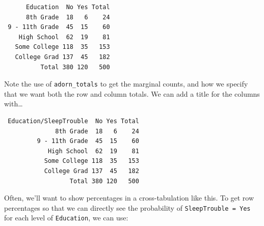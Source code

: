 \documentclass[
]{book}
\newenvironment{Shaded}{\begin{snugshade}}{\end{snugshade}}
\newcommand{\DataTypeTok}[1]{\textcolor[rgb]{0.13,0.29,0.53}{#1}}
\newcommand{\KeywordTok}[1]{\textcolor[rgb]{0.13,0.29,0.53}{\textbf{#1}}}
\newcommand{\NormalTok}[1]{#1}
\newcommand{\OperatorTok}[1]{\textcolor[rgb]{0.81,0.36,0.00}{\textbf{#1}}}
\newcommand{\StringTok}[1]{\textcolor[rgb]{0.31,0.60,0.02}{#1}}
\begin{document}
\begin{verbatim}
      Education  No Yes Total
      8th Grade  18   6    24
 9 - 11th Grade  45  15    60
    High School  62  19    81
   Some College 118  35   153
   College Grad 137  45   182
          Total 380 120   500
\end{verbatim}

Note the use of \texttt{adorn\_totals} to get the marginal counts, and how we specify that we want both the row and column totals. We can add a title for the columns with\ldots{}

\begin{Shaded}
\end{Shaded}

\begin{verbatim}
 Education/SleepTrouble  No Yes Total
              8th Grade  18   6    24
         9 - 11th Grade  45  15    60
            High School  62  19    81
           Some College 118  35   153
           College Grad 137  45   182
                  Total 380 120   500
\end{verbatim}

Often, we'll want to show percentages in a cross-tabulation like this. To get row percentages so that we can directly see the probability of \texttt{SleepTrouble\ =\ Yes} for each level of \texttt{Education}, we can use:

\begin{Shaded}
\end{Shaded}
\end{document}
